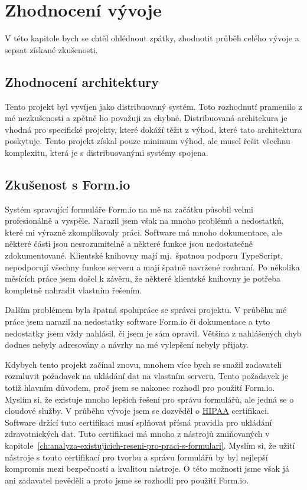 \chapter{Zhodnocení vývoje}\label{ch:zhodnoceni-vyvoje}

V této kapitole bych se chtěl ohlédnout zpátky, zhodnotit průběh celého vývoje a sepsat získané zkušenosti.


\section{Zhodnocení architektury}\label{sec:zhodnoceni-architektury}

Tento projekt byl vyvíjen jako distribuovaný systém.
Toto rozhodnutí pramenilo z mé nezkušenosti a zpětně ho považuji za chybné.
Distribuovaná architekura je vhodná pro specifické projekty, které dokáží těžit z výhod, které tato architektura poskytuje.
Tento projekt získal pouze minimum výhod, ale musel řešit všechnu komplexitu, která je s distribuovanými systémy spojena.


\section{Zkušenost s Form.io}\label{sec:zkusenost-s-formio}

Systém spravující formuláře Form.io na mě na začátku působil velmi profesionálně a vyspěle.
Narazil jsem však na mnoho problémů a nedostatků, které mi výrazně zkomplikovaly práci.
Software má mnoho dokumentace, ale některé části jsou nesrozumitelné a některé funkce jsou nedostatečně zdokumentované.
Klientské knihovny mají mj.\ špatnou podporu TypeScript, nepodporují všechny funkce serveru a mají špatně navržené rozhraní.
Po několika měsících práce jsem došel k závěru, že některé klientské knihovny je potřeba kompletně nahradit vlastním řešením.

Dalším problémem byla špatná spolupráce se správci projektu.
V průběhu mé práce jsem narazil na nedostatky software Form.io či dokumentace a tyto nedostatky jsem vždy nahlásil, či jsem je sám opravil.
Většina z nahlášených chyb dodnes nebyly adresovány a návrhy na mé vylepšení nebyly přijaty.

Kdybych tento projekt začínal znovu, mnohem více bych se snažil zadavateli rozmluvit požadavek na ukládání dat na vlastním serveru.
Tento požadavek je totiž hlavním důvodem, proč jsem se nakonec rozhodl pro použití Form.io.
Myslím si, že existuje mnoho lepších řešení pro správu formulářů, ale jedná se o cloudové služby.
V průběhu vývoje jsem se dozvěděl o \href{https://www.hhs.gov/hipaa/index.html}{HIPAA} certifikaci.
Software držící tuto certifikaci musí splňovat přísná pravidla pro ukládání zdravotnických dat.
Tuto certifikaci má mnoho z nástrojů zmiňovaných v kapitole~\ref{ch:analyza-existujicich-reseni-pro-praci-s-formulari}.
Myslím si, že užití nástroje s touto certifikací pro tvorbu a správu formulářů by byl nejlepší kompromis mezi bezpečností a kvalitou nástroje.
O této možnosti jsme však já ani zadavatel nevěděli a proto jsme se rozhodli pro použití Form.io.


